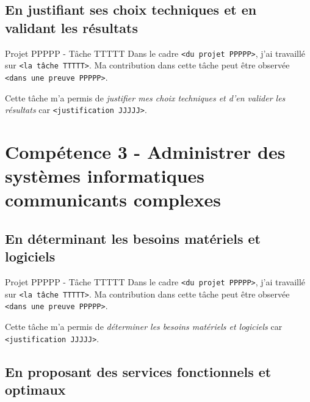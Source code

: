 \documentclass[%
    10pt,%
    usenames,%
    dvipsnames%
]{beamer}
\begin{document}
\subsection{En justifiant ses choix techniques et en validant les
résultats}\label{en-justifiant-ses-choix-techniques-et-en-validant-les-ruxe9sultats}

\begin{frame}[fragile]{Projet PPPPP - Tâche TTTTT}
\label{projet-ppppp---tuxe2che-ttttt-7}
Dans le cadre \texttt{\textless{}du\ projet\ PPPPP\textgreater{}}, j'ai
travaillé sur \texttt{\textless{}la\ tâche\ TTTTT\textgreater{}}. Ma
contribution dans cette tâche peut être observée
\texttt{\textless{}dans\ une\ preuve\ PPPPP\textgreater{}}.

Cette tâche m'a permis de \emph{justifier mes choix techniques et d'en
valider les résultats} car
\texttt{\textless{}justification\ JJJJJ\textgreater{}}.
\end{frame}

\section{Compétence 3 - Administrer des systèmes informatiques
communicants
complexes}\label{compuxe9tence-3---administrer-des-systuxe8mes-informatiques-communicants-complexes}

\subsection{En déterminant les besoins matériels et
logiciels}\label{en-duxe9terminant-les-besoins-matuxe9riels-et-logiciels}

\begin{frame}[fragile]{Projet PPPPP - Tâche TTTTT}
\label{projet-ppppp---tuxe2che-ttttt-8}
Dans le cadre \texttt{\textless{}du\ projet\ PPPPP\textgreater{}}, j'ai
travaillé sur \texttt{\textless{}la\ tâche\ TTTTT\textgreater{}}. Ma
contribution dans cette tâche peut être observée
\texttt{\textless{}dans\ une\ preuve\ PPPPP\textgreater{}}.

Cette tâche m'a permis de \emph{déterminer les besoins matériels et
logiciels} car \texttt{\textless{}justification\ JJJJJ\textgreater{}}.
\end{frame}

\subsection{En proposant des services fonctionnels et
optimaux}\label{en-proposant-des-services-fonctionnels-et-optimaux}
\end{document}

